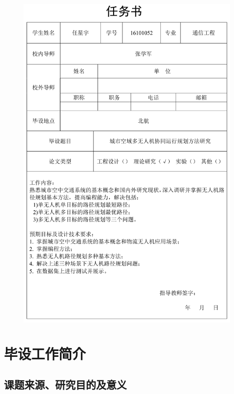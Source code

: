\documentclass[UTF8,a4paper]{ctexart}
\begin{document}
\begin{figure}[ht]
    \centering
    \includegraphics[scale=0.75]{renwushu.png}
\end{figure}
\thispagestyle{empty}
\newpage

\pagestyle{fancy}		%
\rhead{}
\lhead{}
\cfoot{\thepage}			%
\newpage
\section{毕设工作简介}
\setcounter{page}{1}
\subsection{课题来源、研究目的及意义}
\end{document}
